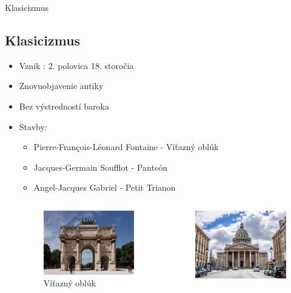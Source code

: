 \documentclass[dvipsnames]{beamer}
\begin{document}
\begin{frame}{Klasicizmus}
	\subsection{Klasicizmus}
	\begin{itemize}
		\item Vznik : 2. polovica 18. storočia
		\item Znovuobjavenie antiky
		\item Bez výstredností baroka
		\item Stavby:
		\begin{itemize}
			\item \textcolor{BurntOrange}{Pierre-François-Léonard Fontaine} - Víťazný oblúk
			\item \textcolor{BurntOrange}{Jacques-Germain Soufflot} - Panteón
			\item \textcolor{BurntOrange}{Angel-Jacques Gabriel} - Petit Trianon
		\end{itemize}
		\begin{columns}
			\kern0pt
			\begin{figure}
				\includegraphics[scale=0.3]{ark}
				\caption{Víťazný oblúk}
			\end{figure}
			\begin{figure}
				\includegraphics[scale=0.3]{panty}

\end{figure}
\end{columns}
\end{itemize}
\end{frame}
\end{document}
